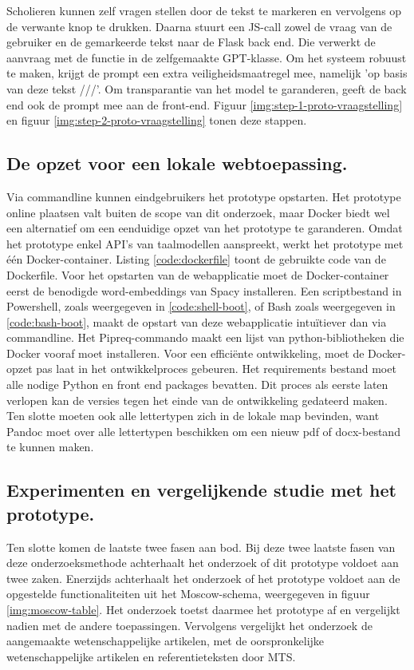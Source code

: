 \medspace

Scholieren kunnen zelf vragen stellen door de tekst te markeren en vervolgens op de verwante knop te drukken. Daarna stuurt een JS-call zowel de vraag van de gebruiker en de gemarkeerde tekst naar de Flask back end. Die verwerkt de aanvraag met de functie in de zelfgemaakte GPT-klasse. Om het systeem robuust te maken, krijgt de prompt een extra veiligheidsmaatregel mee, namelijk 'op basis van deze tekst ///'. Om transparantie van het model te garanderen, geeft de back end ook de prompt mee aan de front-end. Figuur \ref{img:step-1-proto-vraagstelling} en figuur \ref{img:step-2-proto-vraagstelling} tonen deze stappen.

\subsection{De opzet voor een lokale webtoepassing.}

Via commandline kunnen eindgebruikers het prototype opstarten. Het prototype online plaatsen valt buiten de scope van dit onderzoek, maar Docker biedt wel een alternatief om een eenduidige opzet van het prototype te garanderen. Omdat het prototype enkel API's van taalmodellen aanspreekt, werkt het prototype met één Docker-container. Listing \ref{code:dockerfile} toont de gebruikte code van de Dockerfile. Voor het opstarten van de webapplicatie moet de Docker-container eerst de benodigde word-embeddings van Spacy installeren. Een scriptbestand in Powershell, zoals weergegeven in \ref{code:shell-boot}, of Bash zoals weergegeven in \ref{code:bash-boot}, maakt de opstart van deze webapplicatie intuïtiever dan via commandline. Het Pipreq-commando maakt een lijst van python-bibliotheken die Docker vooraf moet installeren. Voor een efficiënte ontwikkeling, moet de Docker-opzet pas laat in het ontwikkelproces gebeuren. Het requirements bestand moet alle nodige Python en front end packages bevatten. Dit proces als eerste laten verlopen kan de versies tegen het einde van de ontwikkeling gedateerd maken. Ten slotte moeten ook alle lettertypen zich in de lokale map bevinden, want Pandoc moet over alle lettertypen beschikken om een nieuw pdf of docx-bestand te kunnen maken.

\subsection{Experimenten en vergelijkende studie met het prototype.}

Ten slotte komen de laatste twee fasen aan bod. Bij deze twee laatste fasen van deze onderzoeksmethode achterhaalt het onderzoek of dit prototype voldoet aan twee zaken. Enerzijds achterhaalt het onderzoek of het prototype voldoet aan de opgestelde functionaliteiten uit het Moscow-schema, weergegeven in figuur \ref{img:moscow-table}. Het onderzoek toetst daarmee het prototype af en vergelijkt nadien met de andere toepassingen. Vervolgens vergelijkt het onderzoek de aangemaakte wetenschappelijke artikelen, met de oorspronkelijke wetenschappelijke artikelen en referentieteksten door MTS.